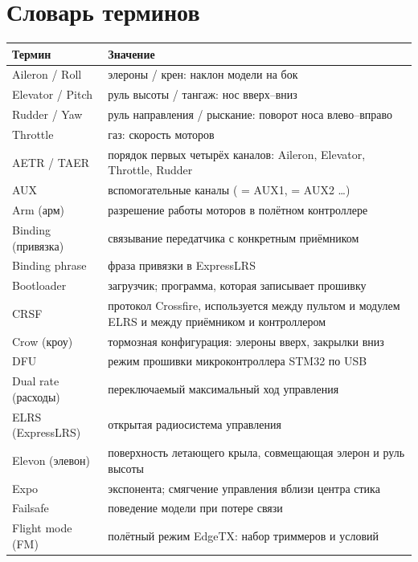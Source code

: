 \chapter{Словарь терминов}

\begin{small}
\renewcommand{\arraystretch}{1.15}
\begin{longtable}{@{}L{40mm}L{120mm}@{}}
\toprule
\textbf{Термин} & \textbf{Значение} \\
\midrule
\endhead
Aileron / Roll & элероны / крен: наклон модели на бок \\
Elevator / Pitch & руль высоты / тангаж: нос вверх--вниз \\
Rudder / Yaw & руль направления / рыскание: поворот носа влево--вправо \\
Throttle & газ: скорость моторов \\
AETR / TAER & порядок первых четырёх каналов: Aileron, Elevator, Throttle, Rudder \\
AUX & вспомогательные каналы ( = AUX1,  = AUX2 …) \\
Arm (арм) & разрешение работы моторов в полётном контроллере \\
Binding (привязка) & связывание передатчика с конкретным приёмником \\
Binding phrase & фраза привязки в ExpressLRS \\
Bootloader & загрузчик; программа, которая записывает прошивку \\
CRSF & протокол Crossfire, используется между пультом и модулем ELRS и между приёмником и
  контроллером \\
Crow (кроу) & тормозная конфигурация: элероны вверх, закрылки вниз \\
DFU & режим прошивки микроконтроллера STM32 по USB \\
Dual rate (расходы) & переключаемый максимальный ход управления \\
ELRS (ExpressLRS) & открытая радиосистема управления \\
Elevon (элевон) & поверхность летающего крыла, совмещающая элерон и руль высоты \\
Expo & экспонента; смягчение управления вблизи центра стика \\
Failsafe & поведение модели при потере связи \\
Flight mode (FM) & полётный режим EdgeTX: набор триммеров и условий \\

\end{longtable}
\end{small}
